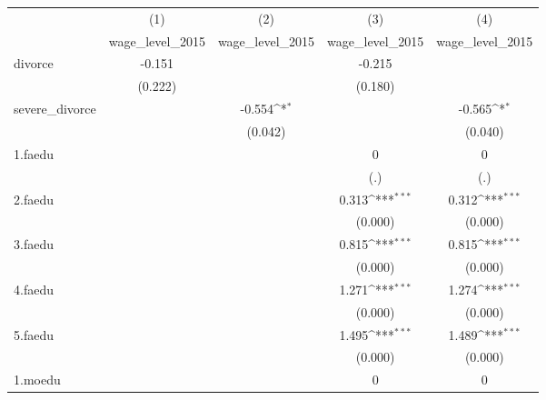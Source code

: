 {
\def\sym#1{\ifmmode^{#1}\else\(^{#1}\)\fi}
\begin{tabular}{l*{4}{c}}
\hline\hline
            &\multicolumn{1}{c}{(1)}&\multicolumn{1}{c}{(2)}&\multicolumn{1}{c}{(3)}&\multicolumn{1}{c}{(4)}\\
            &\multicolumn{1}{c}{wage\_level\_2015}&\multicolumn{1}{c}{wage\_level\_2015}&\multicolumn{1}{c}{wage\_level\_2015}&\multicolumn{1}{c}{wage\_level\_2015}\\
\hline
divorce     &      -0.151         &                     &      -0.215         &                     \\
            &     (0.222)         &                     &     (0.180)         &                     \\
[1em]
severe\_divorce&                     &      -0.554\sym{*}  &                     &      -0.565\sym{*}  \\
            &                     &     (0.042)         &                     &     (0.040)         \\
[1em]
1.faedu     &                     &                     &           0         &           0         \\
            &                     &                     &         (.)         &         (.)         \\
[1em]
2.faedu     &                     &                     &       0.313\sym{***}&       0.312\sym{***}\\
            &                     &                     &     (0.000)         &     (0.000)         \\
[1em]
3.faedu     &                     &                     &       0.815\sym{***}&       0.815\sym{***}\\
            &                     &                     &     (0.000)         &     (0.000)         \\
[1em]
4.faedu     &                     &                     &       1.271\sym{***}&       1.274\sym{***}\\
            &                     &                     &     (0.000)         &     (0.000)         \\
[1em]
5.faedu     &                     &                     &       1.495\sym{***}&       1.489\sym{***}\\
            &                     &                     &     (0.000)         &     (0.000)         \\
[1em]
1.moedu     &                     &                     &           0         &           0         \\

\end{tabular}}
